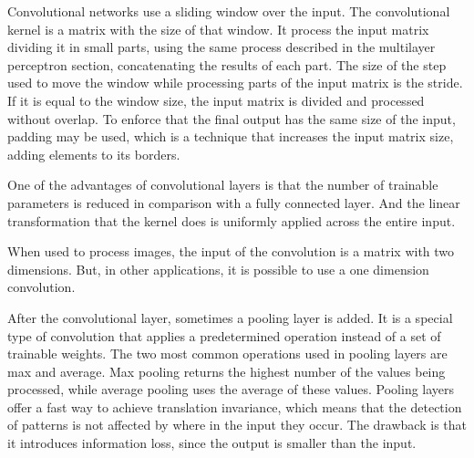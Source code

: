 Convolutional networks \cite{lecun_backpropagation_1989} \cite{lecun_convolutional_1995} use a sliding window over the input. The convolutional kernel is a matrix with the size of that window. It process the input matrix dividing it in small parts, using the same process described in the multilayer perceptron section, concatenating the results of each part. The size of the step used to move the window while processing parts of the input matrix is the stride. If it is equal to the window size, the input matrix is divided and processed without overlap. To enforce that the final output has the same size of the input, padding may be used, which is a technique that increases the input matrix size, adding elements to its borders.

One of the advantages of convolutional layers is that the number of trainable parameters is reduced in comparison with a fully connected layer. And the linear transformation that the kernel does is uniformly applied across the entire input.

When used to process images, the input of the convolution is a matrix with two dimensions. But, in other applications, it is possible to use a one dimension convolution.

After the convolutional layer, sometimes a pooling layer is added. It is a special type of convolution that applies a predetermined operation instead of a set of trainable weights. The two most common operations used in pooling layers are max and average. Max pooling returns the highest number of the values being processed, while average pooling uses the average of these values. Pooling layers offer a fast way to achieve translation invariance\cite{hinton_learning_1987}, which means that the detection of patterns is not affected by where in the input they occur. The drawback is that it introduces information loss, since the output is smaller than the input.